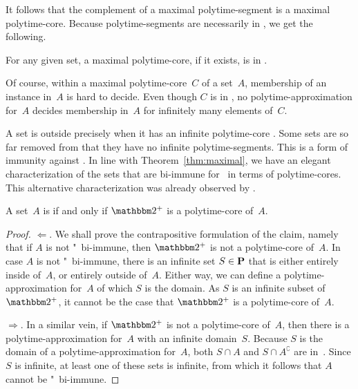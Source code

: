 It follows that the complement of a maximal polytime-segment is a maximal polytime-core.
Because polytime-segments are necessarily in , we get the following.
\begin{corollary}
  For any given set, a maximal polytime-core, if it exists, is in .
\end{corollary}

Of course, within a maximal polytime-core~$C$ of a set~$A$, membership of an instance in~$A$ is hard to decide.
Even though $C$ is in , no polytime-approximation for~$A$ decides membership in~$A$ for infinitely many elements of~$C$.

A set is outside  precisely when it has an infinite polytime-core \parencite{lynch1975reducibility}.
Some sets are so far removed from  that they have no infinite polytime-segments.
This is a form of immunity against .
In line with Theorem~\ref{thm:maximal}, we have an elegant characterization of the sets that are bi-immune for~ in terms of polytime-cores.
This alternative characterization was already observed by \textcite{balcazar1985bi-immune} \parencite[see also][]{book1988polynomial}.
\begin{theorem}
  A set~$A$ is  if and only if $\binary^+$ is a polytime-core of~$A$.
\end{theorem}
\begin{proof}
  $\Longleftarrow$.
  We shall prove the contrapositive formulation of the claim, namely that if $A$ is not "~bi-immune, then $\binary^+$ is not a polytime-core of~$A$.
  In case $A$ is not "~bi-immune, there is an infinite set $S \in \textnormal{\textbf{P}}$ that is either entirely inside of~$A$, or entirely outside of~$A$.
  Either way, we can define a polytime-approximation for~$A$ of which $S$ is the domain.
  As $S$ is an infinite subset of $\binary^+$, it cannot be the case that $\binary^+$ is a polytime-core of~$A$.

  $\Longrightarrow$.
  In a similar vein, if $\binary^+$ is not a polytime-core of~$A$, then there is a polytime-approximation for~$A$ with an infinite domain~$S$.
  Because $S$ is the domain of a polytime-approximation for~$A$, both $S \cap A$ and $S \cap A^\complement$ are in~.
  Since $S$ is infinite, at least one of these sets is infinite, from which it follows that $A$ cannot be "~bi-immune.
\end{proof}

